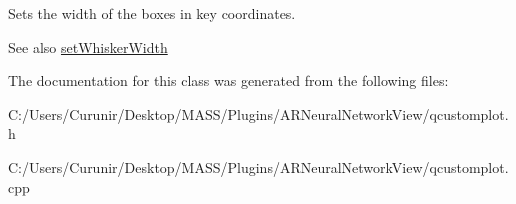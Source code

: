 Sets the width of the boxes in key coordinates.

\begin{DoxySeeAlso}{See also}
\hyperlink{class_q_c_p_statistical_box_adf378812446bd66f34d1f7f293d991cd}{set\+Whisker\+Width} 
\end{DoxySeeAlso}


The documentation for this class was generated from the following files\+:\begin{DoxyCompactItemize}
\item 
C\+:/\+Users/\+Curunir/\+Desktop/\+M\+A\+S\+S/\+Plugins/\+A\+R\+Neural\+Network\+View/qcustomplot.\+h\item 
C\+:/\+Users/\+Curunir/\+Desktop/\+M\+A\+S\+S/\+Plugins/\+A\+R\+Neural\+Network\+View/qcustomplot.\+cpp\end{DoxyCompactItemize}
